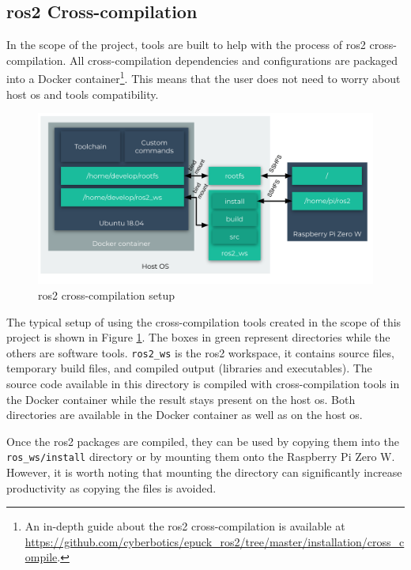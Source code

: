 \subsection{\ac{ros2} Cross-compilation}
In the scope of the project, tools are built to help with the process of \ac{ros2} cross-compilation.
All cross-compilation dependencies and configurations are packaged into a Docker container\footnote{An in-depth guide about the \ac{ros2} cross-compilation is available at \url{https://github.com/cyberbotics/epuck_ros2/tree/master/installation/cross_compile}.}.
This means that the user does not need to worry about host \ac{os} and tools compatibility. 

\begin{figure}[H]
    \centering
    \includegraphics[width=\textwidth]{physical/figures/cross_compilation.pdf}
    \caption{\ac{ros2} cross-compilation setup}
    \label{fig:physical:cross_compilation}
\end{figure}

The typical setup of using the cross-compilation tools created in the scope of this project is shown in Figure \ref{fig:physical:cross_compilation}.
The boxes in green represent directories while the others are software tools.
\texttt{ros2\_ws} is the \ac{ros2} workspace, it contains source files, temporary build files, and compiled output (libraries and executables).
The source code available in this directory is compiled with cross-compilation tools in the Docker container while the result stays present on the host \ac{os}.
Both directories are available in the Docker container as well as on the host \ac{os}.

Once the \ac{ros2} packages are compiled, they can be used by copying them into the \texttt{ros\_ws/install} directory or by mounting them onto the Raspberry Pi Zero W.
However, it is worth noting that mounting the directory can significantly increase productivity as copying the files is avoided.


